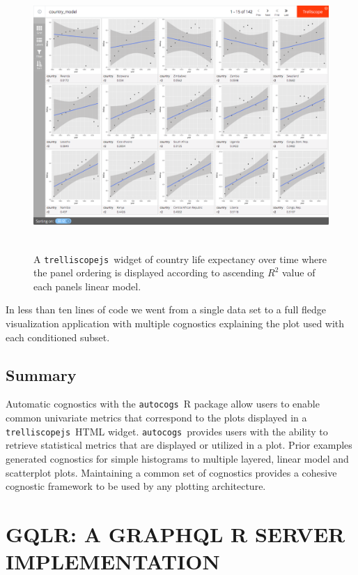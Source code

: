 \documentclass[stat,dissertation]{puthesis}\usepackage[]{graphicx}\usepackage{xcolor}
\newcommand{\pkg}[1]{\texttt{#1}}
\newcommand{\trelliscopejs}{\pkg{trelliscopejs}}
\newcommand{\autocogs}{\pkg{autocogs}}
\begin{document}
\begin{figure}[H]
  \label{fig:country_model_r2}
  \centering
  \includegraphics[height=4in]{./figs/tjs_country_r2.png}
  \caption{A \trelliscopejs~widget of country life expectancy over time where the panel ordering is displayed according to ascending $R^2$ value of each panels linear model.}
\end{figure}



In less than ten lines of code we went from a single data set to a full fledge visualization application with multiple cognostics explaining the plot used with each conditioned subset.


\section{Summary}

  Automatic cognostics with the \autocogs~R package allow users to enable common univariate metrics that correspond to the plots displayed in a \trelliscopejs~HTML widget. \autocogs~provides users with the ability to retrieve statistical metrics that are displayed or utilized in a plot.  Prior examples generated cognostics for simple histograms to multiple layered, linear model and scatterplot plots. Maintaining a common set of cognostics provides a cohesive cognostic framework to be used by any plotting architecture.



\chapter{GQLR: A GRAPHQL R SERVER IMPLEMENTATION} \label{chapter:gqlr}
\end{document}
